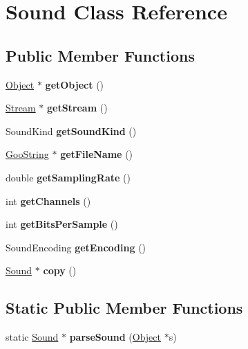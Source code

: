 \hypertarget{class_sound}{}\section{Sound Class Reference}
\label{class_sound}
\subsection*{Public Member Functions}
\begin{DoxyCompactItemize}
\item 
\mbox{\label{class_sound_a883885d364ae3d163b99518ff3b5f07f}} 
\hyperlink{class_object}{Object} $\ast$ {\bfseries get\+Object} ()
\item 
\mbox{\label{class_sound_a235257af421d2ea472b57e76e0332a6d}} 
\hyperlink{class_stream}{Stream} $\ast$ {\bfseries get\+Stream} ()
\item 
\mbox{\label{class_sound_afb3e2591bc5161b91a8ed1b8996fccbd}} 
Sound\+Kind {\bfseries get\+Sound\+Kind} ()
\item 
\mbox{\label{class_sound_a94f5cd649c1186fbf7e55ea6101274bc}} 
\hyperlink{class_goo_string}{Goo\+String} $\ast$ {\bfseries get\+File\+Name} ()
\item 
\mbox{\label{class_sound_ab825f50f2921182c1bcf0876ce846081}} 
double {\bfseries get\+Sampling\+Rate} ()
\item 
\mbox{\label{class_sound_aaee51cb9d66ee02b85a471ad0009dba2}} 
int {\bfseries get\+Channels} ()
\item 
\mbox{\label{class_sound_af11eb17386412a600472634eef171396}} 
int {\bfseries get\+Bits\+Per\+Sample} ()
\item 
\mbox{\label{class_sound_af08d2f739cfaf1bd62fe738deff84b96}} 
Sound\+Encoding {\bfseries get\+Encoding} ()
\item 
\mbox{\label{class_sound_a59f9cb3045da588427c7c057300102d6}} 
\hyperlink{class_sound}{Sound} $\ast$ {\bfseries copy} ()
\end{DoxyCompactItemize}
\subsection*{Static Public Member Functions}
\begin{DoxyCompactItemize}
\item 
\mbox{\label{class_sound_ae614d83132c505f08f59f98f7651b3f9}} 
static \hyperlink{class_sound}{Sound} $\ast$ {\bfseries parse\+Sound} (\hyperlink{class_object}{Object} $\ast$s)
\end{DoxyCompactItemize}


